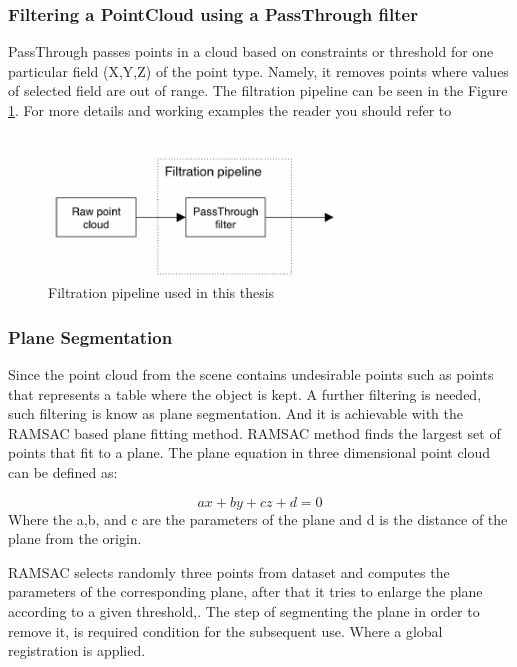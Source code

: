 \subsubsection{Filtering a PointCloud using a PassThrough filter}
PassThrough passes points in a cloud based on constraints or threshold for one particular field (X,Y,Z) of the point type. Namely, it removes points where values of selected field are out of range. The filtration pipeline can be seen in the Figure \ref{fig:passthrough}. For more details and working examples the reader you should refer to \cite{pcl}

\begin{figure}[!h]
\begin{center}
\includegraphics[width=3in]{figures03/passthrough.png}
\caption{Filtration pipeline used in this thesis}%
\label{fig:passthrough}
\end{center}
\end{figure}
\subsubsection{Plane Segmentation}
Since the point cloud from the scene contains undesirable points such as points that represents a table where the object is kept. A further filtering is needed, such filtering is know as plane segmentation. And it is achievable with the RAMSAC based plane fitting method. RAMSAC method finds the largest set of points that fit to a plane. The plane equation in three dimensional point cloud can be defined as:

\begin{equation}
    ax+by+cz+d=0
\end{equation}
Where the a,b, and c are the parameters of the plane and d is the distance of the plane from the origin.

RAMSAC selects randomly three points from dataset and computes the parameters of the corresponding plane, after that it tries to enlarge the plane according to a given threshold,\cite{algPlane}. The step of segmenting the plane in order to remove it, is required condition for the subsequent use. Where a global registration is applied. 

